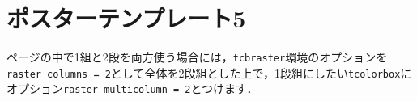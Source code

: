 \documentclass[12pt, a4j, dvipdfmx, sffamily]{jsarticle}
\begin{document}
\newpage
\section*{ポスターテンプレート5}
\begin{tcbraster}[raster columns = 2, raster equal height = rows]
	\begin{tcolorbox}[title = \texttt{raster multicolumn}, raster multicolumn = 2]
	ページの中で1組と2段を両方使う場合には，\texttt{tcbraster}環境のオプションを\texttt{raster columns = 2}として全体を2段組とした上で，1段組にしたい\texttt{tcolorbox}にオプション\texttt{raster multicolumn = 2}とつけます．
	\end{tcolorbox}
	\begin{tcolorbox}[title = lipsum7-2]
	\lipsum[7][2-17]
	\end{tcolorbox}
	\begin{tcolorbox}[title = lipsum8]
	\lipsum[8]
	\end{tcolorbox}
	\begin{tcolorbox}[title = lipsum9, raster multicolumn = 2]
	\lipsum[9]
	\end{tcolorbox}
\end{tcbraster}

\newpage
\end{document}
